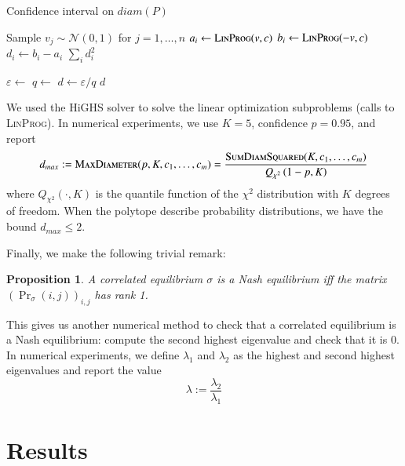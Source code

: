 \documentclass[preprint,12pt,authoryear]{elsarticle}
\newtheorem{proposition}[theorem]{Proposition}
\theoremstyle{definition}
\begin{document}
\begin{algorithm}
\label{alg:diameters}
\caption{Confidence interval on $diam(P)$}
\begin{algorithmic}
    \State Sample $v_j \sim \mathcal{N}(0, 1)$ for $j=1,\ldots,n$
    \State $a_i \gets \textsc{LinProg}(v, c)$ 
    \State $b_i \gets \textsc{LinProg}(-v, c)$ 
    \State $d_i \gets b_i - a_i$
\EndFor
\State \Return $\sum_i d_i^2$
\EndFunction
{}

\State $\varepsilon \gets$ 
\State $q \gets$ 
\State $d \gets \varepsilon / q$
\State \Return $d$
\EndFunction
\end{algorithmic}
\end{algorithm}

We used the HiGHS solver \citep{huangfu2018parallelizing} to solve the linear optimization subproblems (calls to \textsc{LinProg}). In numerical experiments, we use $K=5$, confidence $p=0.95$, and report $$d_{max} :=  \textsc{MaxDiameter}(p, K, c_1, \ldots, c_m) = \frac{\textsc{SumDiamSquared}(K, c_1, \ldots, c_m)} {Q_{\chi^2}\left(1-p, K\right)}$$ where $Q_{\chi^2}(\cdot, K)$ is the quantile function of the $\chi^2$ distribution with $K$ degrees of freedom. When the polytope describe probability distributions, we have the bound $d_{max} \leq 2$.

Finally, we make the following trivial remark:

\begin{proposition}
    A correlated equilibrium $\sigma$ is a Nash equilibrium iff the matrix $(\Pr\nolimits_\sigma(i, j))_{i,j}$ has rank 1.
\end{proposition}

This gives us another numerical method to check that a correlated equilibrium is a Nash equilibrium: compute the second highest eigenvalue and check that it is $0$. In numerical experiments, we define $\lambda_1$ and $\lambda_2$ as the highest and second highest eigenvalues and report the value $$\lambda := \frac{\lambda_2}{\lambda_1}$$



\section{Results}
\end{document}
